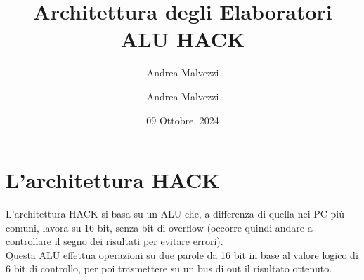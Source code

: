 \documentclass[12pt]{article}
\author{Andrea Malvezzi}
\title{\textbf{Architettura degli Elaboratori\\ALU HACK}}
\date{09 Ottobre, 2024}
\author{Andrea Malvezzi}
\begin{document}
\maketitle
\pagebreak
\tableofcontents
\pagebreak
\section{L'architettura HACK}
L'architettura HACK si basa su un ALU che, a differenza di quella nei PC più comuni, lavora su 16 bit, senza bit di overflow (occorre quindi andare a controllare il segno dei risultati per evitare errori).\\
Questa ALU effettua operazioni su due parole da 16 bit in base al valore logico di 6 bit di controllo, per poi trasmettere su un bus di out il risultato ottenuto.
\subsection{}
\end{document}
